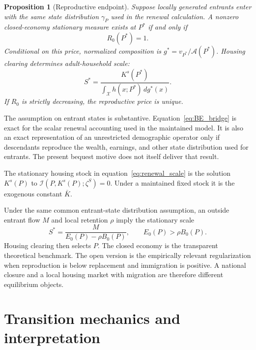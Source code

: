 \documentclass[11pt]{article}
\newtheorem{proposition}{Proposition}
\theoremstyle{definition}
\newcommand{\1}{\mathbf 1}
\newcommand{\X}{\mathcal X}
\begin{document}
\begin{proposition}[Reproductive endpoint]
\label{prop:renewal_ss}
Suppose locally generated entrants enter with the same state distribution
$\gamma_P$ used in the renewal calculation. A nonzero closed-economy stationary
measure exists at $P^*$ if and only if
\begin{equation}
 R_0(P^*)=1.
 \label{eq:renewal_root}
\end{equation}
Conditional on this price, normalized composition is
$g^*=v_{P^*}/\mathcal A(P^*)$.
Housing clearing determines adult-household scale:
\begin{equation}
 S^*=\frac{K^s(P^*)}
 {\int_{\X}h(x;P^*)\,dg^*(x)}.
 \label{eq:renewal_scale}
\end{equation}
If $R_0$ is strictly decreasing, the reproductive price is unique.
\end{proposition}

The assumption on entrant states is substantive. Equation~\eqref{eq:BE_bridge}
is exact for the scalar renewal accounting used in the maintained model. It is
also an exact representation of an unrestricted demographic operator only if
descendants reproduce the wealth, earnings, and other state distribution used
for entrants. The present bequest motive does not itself deliver that result.

The stationary housing stock in equation~\eqref{eq:renewal_scale} is the
solution $K^s(P)$ to $\mathcal I(P,K^s(P);\zeta^S)=0$. Under a maintained fixed
stock it is the exogenous constant $\bar K$.

Under the same common entrant-state distribution assumption, an outside
entrant flow $M$ and local retention $\rho$ imply the stationary scale
\begin{equation}
 S^*=\frac{M}
 {E_0(P)-\rho B_0(P)},
 \qquad E_0(P)>\rho B_0(P).
 \label{eq:scalar_open_ss}
\end{equation}
Housing clearing then selects $P$. The closed economy is the transparent
theoretical benchmark. The open version is the empirically relevant
regularization when reproduction is below replacement and immigration is
positive. A national closure and a local housing market with migration are
therefore different equilibrium objects.

\section{Transition mechanics and interpretation}
\label{sec:transition_mechanics}
\end{document}
